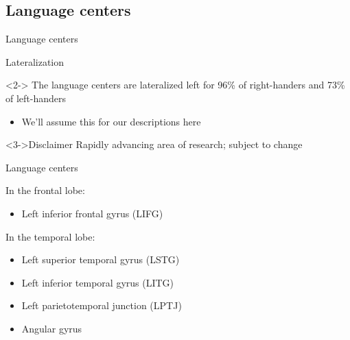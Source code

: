 \documentclass{beamer}
\newcommand{\subtwotwo}{Language centers}
\begin{document}
    \subsection{\subtwotwo}
      \begin{frame}{\subtwotwo}
        \begin{alertblock}{Lateralization}
          
        \end{alertblock}
        \begin{block}<2->{}
          The language centers are lateralized left for 96\% of right-handers and 73\% of left-handers \parencite{knecht_handedness_2000}
          \begin{itemize}
            \item We'll assume this for our descriptions here
          \end{itemize}
        \end{block}
        \begin{block}<3->{Disclaimer}
          Rapidly advancing area of research; subject to change
        \end{block}
      \end{frame}

      \begin{frame}{\subtwotwo}
        \begin{block}{}
          In the frontal lobe:
          \begin{itemize}
            \item Left inferior frontal gyrus (LIFG)
          \end{itemize}
          In the temporal lobe:

          \begin{minipage}[t]{0.48\linewidth}
            \begin{itemize}
              \item Left superior temporal gyrus (LSTG)
              \item Left inferior temporal gyrus (LITG)
            \end{itemize}
          \end{minipage}
          \begin{minipage}[t]{0.48\linewidth}
            \begin{itemize}
              \item Left parietotemporal junction (LPTJ)
              \item Angular gyrus
            \end{itemize}
          \end{minipage}
        \end{block}
      \end{frame}
\end{document}
